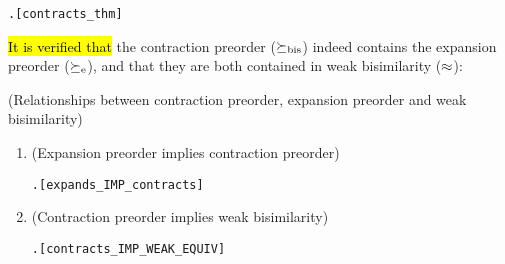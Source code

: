 \begin{alltt}
\HOLTokenTurnstile{}  \HOLSymConst{\HOLTokenContracts{}}  \HOLSymConst{\HOLTokenEquiv{}} \HOLSymConst{\HOLTokenExists{}}.    \HOLSymConst{\HOLTokenConj{}}  \hfill{[contracts_thm]}
\end{alltt}

\hl{It is verified that} the contraction preorder
($\mathrel{\succeq_{\rm{bis}}}$) indeed contains the expansion
preorder ($\mathrel{\succeq_{\rm{e}}}$), and that they are both contained in weak bisimilarity ($\approx$):
\begin{proposition}{(Relationships between contraction preorder,
    expansion preorder and weak bisimilarity)}
\begin{enumerate}
\item (Expansion preorder implies contraction preorder)
\begin{alltt}
\HOLTokenTurnstile{} \HOLSymConst{\HOLTokenForall{}} .  \HOLSymConst{\HOLTokenExpands{}}  \HOLSymConst{\HOLTokenImp{}}  \HOLSymConst{\HOLTokenContracts{}} \hfill[expands_IMP_contracts]
\end{alltt}
\item (Contraction preorder implies weak bisimilarity)
\begin{alltt}
\HOLTokenTurnstile{} \HOLSymConst{\HOLTokenForall{}} .  \HOLSymConst{\HOLTokenContracts{}}  \HOLSymConst{\HOLTokenImp{}}  \HOLSymConst{\HOLTokenWeakEQ} \hfill[contracts_IMP_WEAK_EQUIV]
\end{alltt}
\end{enumerate}
\end{proposition}

